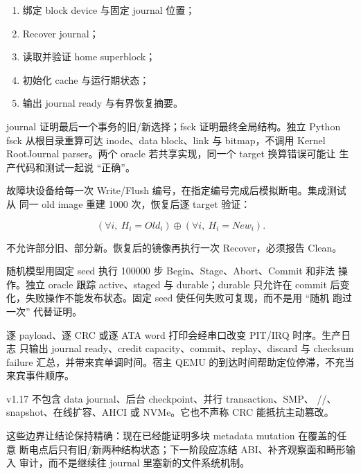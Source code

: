 \begin{enumerate}
  \item 绑定 block device 与固定 journal 位置；
  \item Recover journal；
  \item 读取并验证 home superblock；
  \item 初始化 cache 与运行期状态；
  \item 输出 journal ready 与有界恢复摘要。
\end{enumerate}

journal 证明最后一个事务的旧/新选择；fsck 证明最终全局结构。独立 Python
fsck 从根目录重算可达 inode、data block、link 与 bitmap，不调用 Kernel
RootJournal parser。两个 oracle 若共享实现，同一个 target 换算错误可能让
生产代码和测试一起说 ``正确''。

故障块设备给每一次 Write/Flush 编号，在指定编号完成后模拟断电。集成测试从
同一 old image 重建 1000 次，恢复后逐 target 验证：

\[
(\forall i,\ H_i=Old_i)
\oplus
(\forall i,\ H_i=New_i).
\]

不允许部分旧、部分新。恢复后的镜像再执行一次 Recover，必须报告 Clean。

随机模型用固定 seed 执行 100000 步 Begin、Stage、Abort、Commit 和非法
操作。独立 oracle 跟踪 active、staged 与 durable；durable 只允许在 commit
后变化，失败操作不能发布状态。固定 seed 使任何失败可复现，而不是用 ``随机
跑过一次'' 代替证明。

逐 payload、逐 CRC 或逐 ATA word 打印会经串口改变 PIT/IRQ 时序。生产日志
只输出 journal ready、credit capacity、commit、replay、discard 与 checksum
failure 汇总，并带来宾单调时间。宿主 QEMU 的到达时间帮助定位停滞，不充当
来宾事件顺序。

v1.17 不包含 data journal、后台 checkpoint、并行 transaction、SMP、
//、snapshot、在线扩容、AHCI 或
NVMe。它也不声称 CRC 能抵抗主动篡改。

这些边界让结论保持精确：现在已经能证明多块 metadata mutation 在覆盖的任意
断电点后只有旧/新两种结构状态；下一阶段应冻结 ABI、补齐观察面和畸形输入
审计，而不是继续往 journal 里塞新的文件系统机制。
